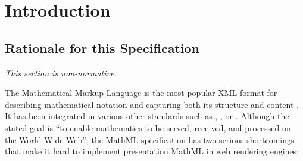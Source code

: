 \section{Introduction}

\subsection{Rationale for this Specification}

{\em This section is non-normative.}

The Mathematical Markup Language is the most popular XML format for describing
mathematical notation and capturing both its structure and content
\cite{MathML3}. It has been integrated in various other standards such as
\cite{HTML5}, \cite{EPUB3}, \cite{ODF1} or \cite{Daisy3}. Although
the stated goal is ``to enable mathematics to be served, received, and
processed on the World Wide Web'', the MathML specification has
two serious shortcomings that make it hard to implement presentation MathML in
web rendering engines:

